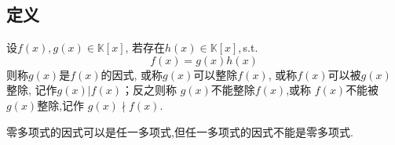 \subsection{定义}
\begin{formal}
\begin{definition}[整除]\label{def:整除}
    设$f\left(x\right),g\left(x\right)\in \mathbb{K}\left[x\right]$,
    若存在$h\left(x\right)\in \mathbb{K}\left[x\right]$,\,\textup{s.t.}
    \[
    f\left(x\right)=g\left(x\right)h\left(x\right)
    \]
    则称$g\left(x\right)$是$f\left(x\right)$的因式,
    或称$g\left(x\right)$可以整除$f\left(x\right)$,
    或称$f\left(x\right)$可以被$g\left(x\right)$整除,
    记作$g\left(x\right)|f\left(x\right)$；反之则称
    $g\left(x\right)$不能整除$f\left(x\right)$,或称
    $f\left(x\right)$不能被$g\left(x\right)$整除,记作
    $g\left(x\right)\nmid f\left(x\right)$.
\end{definition}
\end{formal}
\begin{red}
\begin{remark}
    零多项式的因式可以是任一多项式,但任一多项式的因式不能是零多项式.
\end{remark}
\end{red}
